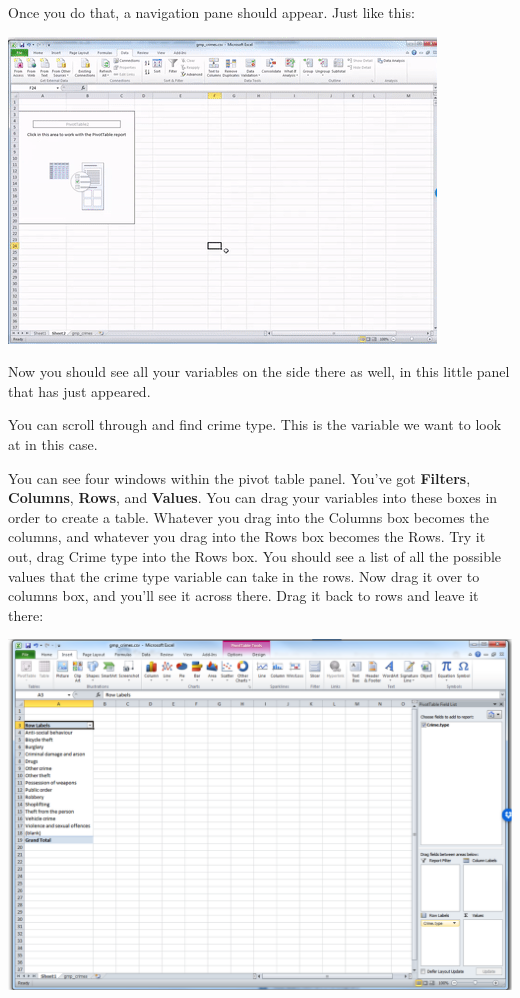 \documentclass[
]{book}
\begin{document}
Once you do that, a navigation pane should appear. Just like this:

\includegraphics{imgs/click_pivot_activate.gif}

Now you should see all your variables on the side there as well, in this little panel that has just appeared.

You can scroll through and find crime type. This is the variable we want to look at in this case.

You can see four windows within the pivot table panel. You've got \textbf{Filters}, \textbf{Columns}, \textbf{Rows}, and \textbf{Values}. You can drag your variables into these boxes in order to create a table. Whatever you drag into the Columns box becomes the columns, and whatever you drag into the Rows box becomes the Rows. Try it out, drag Crime type into the Rows box. You should see a list of all the possible values that the crime type variable can take in the rows. Now drag it over to columns box, and you'll see it across there. Drag it back to rows and leave it there:

\includegraphics{imgs/ct_in_rows.png}
\end{document}
